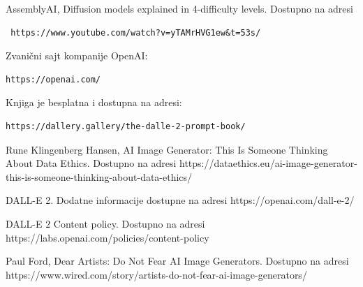 \documentclass[12pt, letterpaper]{article}
\begin{document}
\begin{thebibliography}{10}
 AssemblyAI, Diffusion models explained in 4-difficulty levels. Dostupno na adresi\begin{verbatim} https://www.youtube.com/watch?v=yTAMrHVG1ew&t=53s/
\end{verbatim}

Zvanični sajt kompanije OpenAI:\begin{verbatim}https://openai.com/\end{verbatim}

Knjiga je besplatna i dostupna na adresi:\begin{verbatim}https://dallery.gallery/the-dalle-2-prompt-book/\end{verbatim}

 Rune Klingenberg Hansen, AI Image Generator: This Is Someone Thinking About Data Ethics. Dostupno na adresi https://dataethics.eu/ai-image-generator-this-is-someone-thinking-about-data-ethics/

 DALL-E 2. Dodatne informacije dostupne na adresi https://openai.com/dall-e-2/

 DALL-E 2 Content policy. Dostupno na adresi https://labs.openai.com/policies/content-policy

 Paul Ford, Dear Artists: Do Not Fear AI Image Generators. Dostupno na adresi https://www.wired.com/story/artists-do-not-fear-ai-image-generators/

\end{thebibliography}
\end{document}

